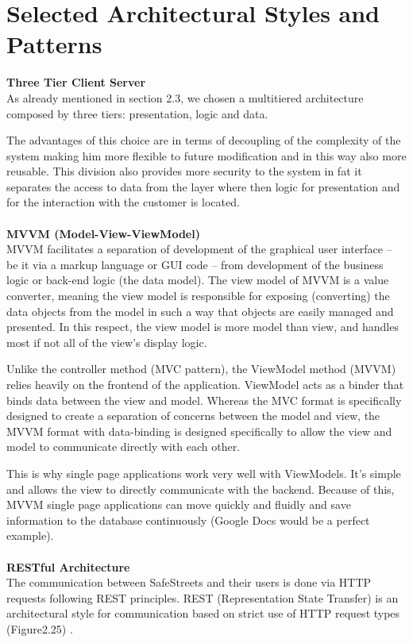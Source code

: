 \documentclass[../RASD.tex]{subfiles}
\begin{document}
    \section{Selected Architectural Styles and Patterns}\label{sec:selected-architectural-styles-and-patterns}
    \textbf{Three Tier Client Server} \\
    As already mentioned in section 2.3, we chosen a multitiered architecture composed by three tiers: presentation, logic and data.

    The advantages of this choice are in terms of decoupling of the complexity of the system making him more flexible to future modification and in this way also more reusable. This division also provides more security to the system in fat it separates the access to data from the layer where then logic for presentation and for the interaction with the customer is located.
    \\
    \\
    \textbf{MVVM (Model-View-ViewModel)} \\
    MVVM facilitates a separation of development of the graphical user interface – be it via a markup language or GUI code – from development of the business logic or back-end logic (the data model). The view model of MVVM is a value converter, meaning the view model is responsible for exposing (converting) the data objects from the model in such a way that objects are easily managed and presented. In this respect, the view model is more model than view, and handles most if not all of the view's display logic.

    Unlike the controller method (MVC pattern), the ViewModel method (MVVM) relies heavily on the frontend of the application. ViewModel acts as a binder that binds data between the view and model. Whereas the MVC format is specifically designed to create a separation of concerns between the model and view, the MVVM format with data-binding is designed specifically to allow the view and model to communicate directly with each other.

    This is why single page applications work very well with ViewModels. It’s simple and allows the view to directly communicate with the backend. Because of this, MVVM single page applications can move quickly and fluidly and save information to the database continuously (Google Docs would be a perfect example).
    \\
    \\
    \textbf{RESTful Architecture} \\
    The communication between SafeStreets and their users is done via HTTP requests following REST principles. REST (Representation State Transfer) is an architectural style for communication based on strict use of HTTP request types (Figure2.25) .
\end{document}
